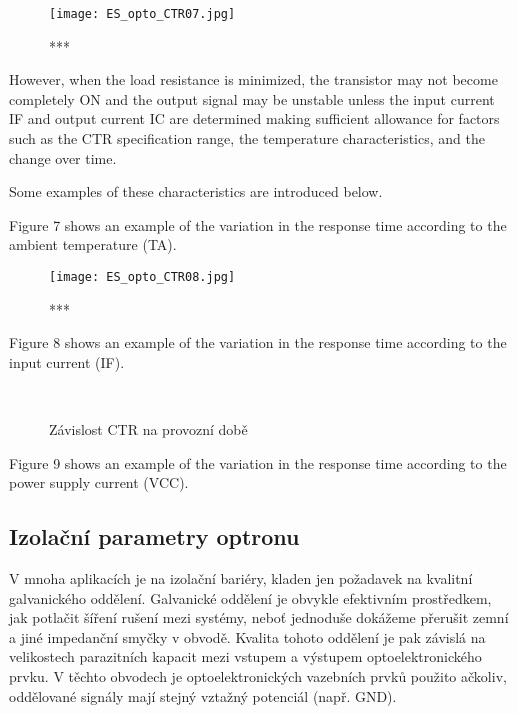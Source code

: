          \begin{figure}[ht!]
           \centering
           \texttt{[image: ES\_opto\_CTR07.jpg]}
           \caption{***}
           \label{es:fig_opto_CTR07}
         \end{figure}             
          However, when the load resistance is minimized, the transistor may not become completely
          ON and the output signal may be unstable unless the input current IF and output current IC
          are determined making sufficient allowance for factors such as the CTR specification
          range, the temperature characteristics, and the change over time.
                   
          Some examples of these characteristics are introduced below.      
                   
          Figure 7 shows an example of the variation in the response time according to the ambient
          temperature (TA).
         
          \begin{figure}[ht!]
            \centering
            \texttt{[image: ES\_opto\_CTR08.jpg]}
            \caption{***}
            \label{es:fig_opto_CTR08}
          \end{figure}       
          Figure 8 shows an example of the variation in the response time according to the input
          current (IF).
          
          \begin{figure}[ht!]
            \centering
              {}                   \\
              {}   
             \caption{Závislost CTR na provozní době}
             \label{ES:fig_opto_tfvsIF}
          \end{figure}
       
          Figure 9 shows an example of the variation in the response time according to the power
          supply current (VCC).
          
      \subsection{Izolační parametry optronu}
        V mnoha aplikacích je na izolační bariéry, kladen jen požadavek na kvalitní galvanického
        oddělení. Galvanické oddělení je obvykle efektivním prostředkem, jak potlačit šíření rušení
        mezi systémy, neboť jednoduše dokážeme přerušit zemní a jiné impedanční smyčky v obvodě.
        Kvalita tohoto oddělení je pak závislá na velikostech parazitních kapacit mezi vstupem a
        výstupem optoelektronického prvku. V těchto obvodech je optoelektronických vazebních prvků
        použito ačkoliv, oddělované signály mají stejný vztažný potenciál (např. GND). 
        
